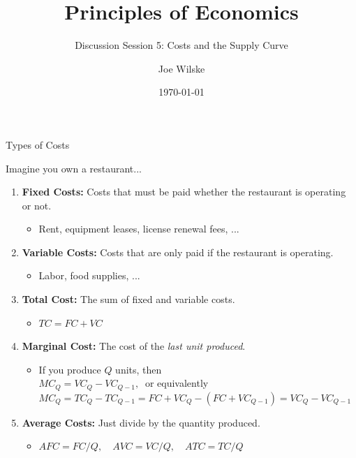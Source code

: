 \documentclass[9pt]{beamer}
\title{Principles of Economics}
\subtitle{Discussion Session 5: Costs and the Supply Curve}
\author{Joe Wilske}
\institute{Boston College}
\date{\today}
\begin{document}
\frame{\titlepage}

\begin{frame}{Types of Costs}

Imagine you own a restaurant...
\vspace{5pt}
    \begin{enumerate}
        \item \textbf{Fixed Costs:} Costs that must be paid whether the restaurant is operating or not.
        \begin{itemize}
            \item Rent, equipment leases, license renewal fees, ...
        \end{itemize}
        \vspace{5pt}
        \item \textbf{Variable Costs:} Costs that are only paid if the restaurant is operating.
        \begin{itemize}
            \item Labor, food supplies, ...
        \end{itemize}
        \vspace{5pt}
        \item \textbf{Total Cost:} The sum of fixed and variable costs. 
        \begin{itemize}
            \item $TC = FC + VC$    
        \end{itemize}
        \vspace{5pt}
        \item \textbf{Marginal Cost:}  The cost of the \textit{last unit produced}.
        \begin{itemize}
            \item If you produce $Q$ units, then\\
            \vspace{2pt}
            $MC_Q = VC_Q - VC_{Q-1}, \:$ or equivalently\\
            \vspace{2pt}
            $MC_Q = TC_Q - TC_{Q-1} = FC + VC_Q - (FC + VC_{Q-1}) = VC_Q - VC_{Q-1}$
        \end{itemize}
        \vspace{5pt}
        \item \textbf{Average Costs:} Just divide by the quantity produced.
        \begin{itemize}
            \item $AFC = FC/Q, \quad AVC = VC/Q, \quad ATC = TC/Q$
        \end{itemize}
    \end{enumerate}
\end{frame}
\end{document}
